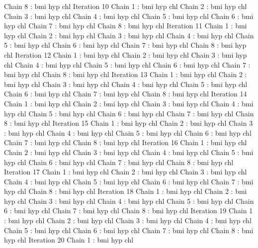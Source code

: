 \begin{Schunk}
\begin{Soutput}
 Chain 8 : bmi   hyp   chl   
Iteration 10 
 Chain 1 : bmi   hyp   chl   
 Chain 2 : bmi   hyp   chl   
 Chain 3 : bmi   hyp   chl   
 Chain 4 : bmi   hyp   chl   
 Chain 5 : bmi   hyp   chl   
 Chain 6 : bmi   hyp   chl   
 Chain 7 : bmi   hyp   chl   
 Chain 8 : bmi   hyp   chl   
Iteration 11 
 Chain 1 : bmi   hyp   chl   
 Chain 2 : bmi   hyp   chl   
 Chain 3 : bmi   hyp   chl   
 Chain 4 : bmi   hyp   chl   
 Chain 5 : bmi   hyp   chl   
 Chain 6 : bmi   hyp   chl   
 Chain 7 : bmi   hyp   chl   
 Chain 8 : bmi   hyp   chl   
Iteration 12 
 Chain 1 : bmi   hyp   chl   
 Chain 2 : bmi   hyp   chl   
 Chain 3 : bmi   hyp   chl   
 Chain 4 : bmi   hyp   chl   
 Chain 5 : bmi   hyp   chl   
 Chain 6 : bmi   hyp   chl   
 Chain 7 : bmi   hyp   chl   
 Chain 8 : bmi   hyp   chl   
Iteration 13 
 Chain 1 : bmi   hyp   chl   
 Chain 2 : bmi   hyp   chl   
 Chain 3 : bmi   hyp   chl   
 Chain 4 : bmi   hyp   chl   
 Chain 5 : bmi   hyp   chl   
 Chain 6 : bmi   hyp   chl   
 Chain 7 : bmi   hyp   chl   
 Chain 8 : bmi   hyp   chl   
Iteration 14 
 Chain 1 : bmi   hyp   chl   
 Chain 2 : bmi   hyp   chl   
 Chain 3 : bmi   hyp   chl   
 Chain 4 : bmi   hyp   chl   
 Chain 5 : bmi   hyp   chl   
 Chain 6 : bmi   hyp   chl   
 Chain 7 : bmi   hyp   chl   
 Chain 8 : bmi   hyp   chl   
Iteration 15 
 Chain 1 : bmi   hyp   chl   
 Chain 2 : bmi   hyp   chl   
 Chain 3 : bmi   hyp   chl   
 Chain 4 : bmi   hyp   chl   
 Chain 5 : bmi   hyp   chl   
 Chain 6 : bmi   hyp   chl   
 Chain 7 : bmi   hyp   chl   
 Chain 8 : bmi   hyp   chl   
Iteration 16 
 Chain 1 : bmi   hyp   chl   
 Chain 2 : bmi   hyp   chl   
 Chain 3 : bmi   hyp   chl   
 Chain 4 : bmi   hyp   chl   
 Chain 5 : bmi   hyp   chl   
 Chain 6 : bmi   hyp   chl   
 Chain 7 : bmi   hyp   chl   
 Chain 8 : bmi   hyp   chl   
Iteration 17 
 Chain 1 : bmi   hyp   chl   
 Chain 2 : bmi   hyp   chl   
 Chain 3 : bmi   hyp   chl   
 Chain 4 : bmi   hyp   chl   
 Chain 5 : bmi   hyp   chl   
 Chain 6 : bmi   hyp   chl   
 Chain 7 : bmi   hyp   chl   
 Chain 8 : bmi   hyp   chl   
Iteration 18 
 Chain 1 : bmi   hyp   chl   
 Chain 2 : bmi   hyp   chl   
 Chain 3 : bmi   hyp   chl   
 Chain 4 : bmi   hyp   chl   
 Chain 5 : bmi   hyp   chl   
 Chain 6 : bmi   hyp   chl   
 Chain 7 : bmi   hyp   chl   
 Chain 8 : bmi   hyp   chl   
Iteration 19 
 Chain 1 : bmi   hyp   chl   
 Chain 2 : bmi   hyp   chl   
 Chain 3 : bmi   hyp   chl   
 Chain 4 : bmi   hyp   chl   
 Chain 5 : bmi   hyp   chl   
 Chain 6 : bmi   hyp   chl   
 Chain 7 : bmi   hyp   chl   
 Chain 8 : bmi   hyp   chl   
Iteration 20 
 Chain 1 : bmi   hyp   chl   

\end{Soutput}
\end{Schunk}
